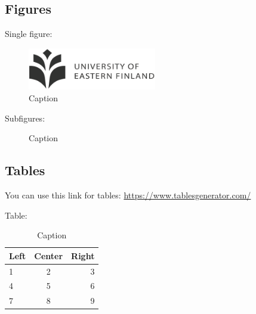 \subsection{Figures}

Single figure:
\begin{figure}[H] %
  \centering
  \includegraphics[width=0.5\textwidth]{images/UEF_logo.png}
  \caption[]{Caption}
  \label{fig:label}
\end{figure}

Subfigures:
\begin{figure}[H] %
  \centering
  \hspace{0.1cm}
  \caption[]{Caption}
  \label{fig:label}
\end{figure}

\subsection{Tables}
You can use this link for tables: \url{https://www.tablesgenerator.com/}

Table:
\begin{table}[H]
  \centering
  {
    \begin{tabular}{|l|c|r|}
      \hline
      \textbf{Left} & \textbf{Center} & \textbf{Right} \\ \hline \hline
      1 & 2 & 3 \\ \hline
      4 & 5 & 6 \\ \hline
      7 & 8 & 9 \\ \hline

  \end{tabular}}
  \caption{Caption}
  \label{tab:label}
\end{table}


